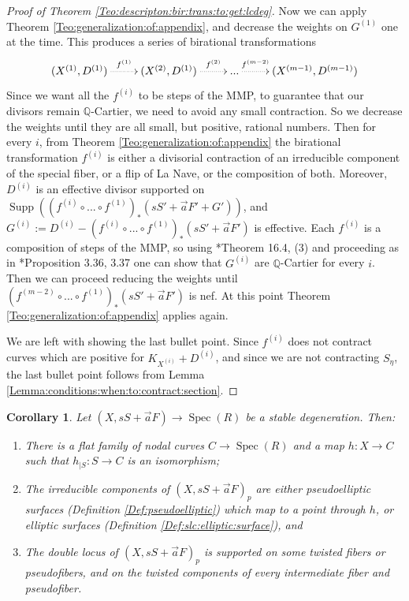 \documentclass[11pt]{amsart}
\newcommand{\spec}{\operatorname{Spec}}
\newcommand{\supp}{\operatorname{Supp}}
\newtheorem{Cor}[theorem]{Corollary}
\theoremstyle{definition}
\begin{document}
\begin{proof}[Proof of Theorem \ref{Teo:descripton:bir:trans:to:get:lcdeg}]
Now we can apply Theorem \ref{Teo:generalization:of:appendix}, and decrease the weights on $G^{(1)}$ one at the time.
This produces a series of birational transformations 
$$\xymatrix{\ar @{} [r]
 (X^{(1)},D^{(1)}) \ar@{.>}^{f^{(1)}}[r] &(X^{(2)},D^{(1)}) \ar@{.>}^-{f^{(2)}}[r]&\text{...} \ar@{.>}^-{f^{(m-2)}}[r] &
 (X^{(m-1)},D^{(m-1)})}$$
Since we want all the $f^{(i)}$ to be steps of the MMP, to guarantee that our divisors remain $\mathbb{Q}$-Cartier, we need to avoid any small contraction.
So we decrease the weights until they are all small, but positive, rational numbers.
 Then for every $i$, from Theorem \ref{Teo:generalization:of:appendix} the birational transformation
 $f^{(i)}$ is either a divisorial contraction of an irreducible component of the special fiber, or a flip of La Nave, or the composition
 of both. 
 Moreover, $D^{(i)}$ is an effective divisor supported on $\supp((f^{(i)} \circ ... \circ f^{(1)})_*(sS'+\vec{a}F'+G'))$,
 and $G^{(i)}:=D^{(i)}-(f^{(i)} \circ ... \circ f^{(1)})_*(sS'+\vec{a}F')$ is effective.
 Each $f^{(i)}$ is a composition of steps of the MMP, so using \cite{Fuj-contraction}*{Theorem 16.4, (3)} and proceeding as in \cite{KM}*{Proposition 3.36, 3.37}
 one can show that $G^{(i)}$ are $\mathbb{Q}$-Cartier for every $i$.
 Then we can proceed reducing the weights until $(f^{(m-2)} \circ ... \circ f^{(1)})_*(sS'+\vec{a}F')$ is nef.
 At this point Theorem \ref{Teo:generalization:of:appendix} applies again.
 
 We are left with showing the last bullet point. Since $f^{(i)}$ does not contract curves which are positive for $K_{X^{(i)}}+D^{(i)}$, and since we are not contracting $S_\eta$, the last bullet point follows from Lemma \ref{Lemma:conditions:when:to:contract:section}.
\end{proof}
\begin{Cor}\label{Cor:description:lc:degeneration}
 Let $(X,sS+\vec{a}F) \to \spec(R)$ be a stable degeneration. Then:
 \begin{enumerate} \item There is a flat family of nodal curves $C \to \spec(R)$ and a map $h:X \to C$ such that $h_{|S}:S \to C$ is an isomorphism; \item The irreducible components of $(X,sS+\vec{a}F)_p$ are either pseudoelliptic surfaces (Definition \ref{Def:pseudoelliptic}) which map to a point through $h$, or elliptic surfaces (Definition \ref{Def:slc:elliptic:surface}), and
  \item  The double locus of $(X,sS+\vec{a}F)_p$ is supported on some twisted fibers or pseudofibers, and on the twisted components of every intermediate fiber and pseudofiber.
 \end{enumerate}
\end{Cor}
\end{document}

